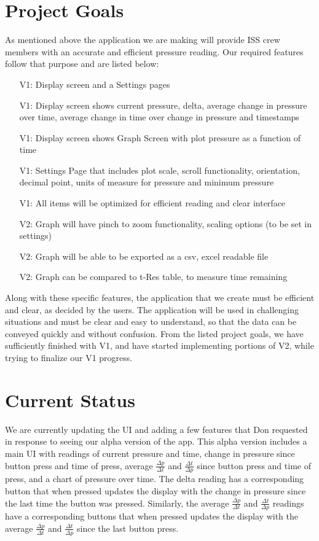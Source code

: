 \documentclass[onecolumn, draftclsnofoot,10pt, compsoc]{IEEEtran}
\begin{document}
\section{Project Goals}
As mentioned above the application we are making will provide ISS crew members with an accurate and efficient pressure reading.
Our required features follow that purpose and are listed below:
\begin{itemize}
\item[V1:] Display screen and a Settings pages
\item [V1:] Display screen shows current pressure, delta, average change in pressure over time, average change in time over change in pressure and timestamps
\item[V1:]  Display screen shows Graph Screen with plot pressure as a function of time
\item[V1:] Settings Page that includes plot scale, scroll functionality, orientation, decimal point, units of measure for pressure and minimum pressure
\item[V1:] All items will be optimized for efficient reading and clear interface
\item[V2:] Graph will have pinch to zoom functionality, scaling options (to be set in settings)
\item[V2:] Graph will be able to be exported as a csv, excel readable file
\item[V2:] Graph can be compared to t-Res table, to measure time remaining
\end{itemize}

Along with these specific features, the application that we create must be efficient and clear, as decided by the users.
The application will be used in challenging situations and must be clear and easy to understand, so that the data can be conveyed quickly and without confusion.
From the listed project goals, we have sufficiently finished with V1, and have started implementing portions of V2, while trying to finalize our V1 progress.


\section{Current Status}
    We are currently updating the UI and adding a few features that Don requested in response to seeing our alpha version of the app.
    This alpha version includes a main UI with readings of current pressure and time, change in pressure since button press and time of press, average $\frac{\Delta p}{\Delta t}$ and $\frac{\Delta t}{\Delta p}$ since button press and time of press, and a chart of pressure over time.
    The delta reading has a corresponding button that when pressed updates the display with the change in pressure since the last time the button was pressed.
    Similarly, the average $\frac{\Delta p}{\Delta t}$ and $\frac{\Delta t}{\Delta p}$ readings have a corresponding buttons that when pressed updates the display with the average $\frac{\Delta p}{\Delta t}$ and $\frac{\Delta t}{\Delta p}$ since the last button press.
\end{document}
